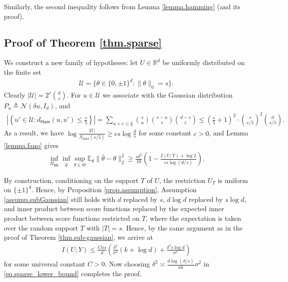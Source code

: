 \documentclass[final,12pt]{colt2018} %
\def \bE {\mathbb{E}}
\def \bR {\mathbb{R}}
\newcommand{\calN}{{\mathcal{N}}}
\newcommand{\calU}{{\mathcal{U}}}
\begin{document}
Similarly, the second inequality follows from Lemma \ref{lemma.hamming} (and its proof). 

\subsection{Proof of Theorem \ref{thm.sparse}}
We construct a new family of hypotheses: let $U\in\bR^d$ be uniformly distributed on the finite set
\begin{align*}
\calU = \{\theta\in \{0,\pm 1\}^d : \|\theta\|_0=s\}.
\end{align*}
Clearly $|\calU|=2^s\binom{d}{s}$. For $u\in\calU$ we associate with the Gaussian distribution $P_u \triangleq \calN(\delta u,I_d)$, and
\begin{align*}
\left|\left\{u'\in\calU: d_{\mathsf{Ham}}(u,u')\le \frac{s}{5}\right\}\right| = \sum_{u+v\le \frac{s}{5}} \binom{s}{u}\binom{s-u}{v}\binom{d-s}{v} \le \left(\frac{s}{5}+1\right)^2\cdot \binom{s}{s/5}^2\binom{d}{s/5}.
\end{align*}
As a result, we have $\log \frac{|\calU|}{N_{\max}(s/5)}\ge cs\log\frac{d}{s}$ for some constant $c>0$, and Lemma \ref{lemma.fano} gives
\begin{align}\label{eq.sparse_lower_bound}
\inf_{\Pi_{\mathsf{BB}}}\inf_{\hat{\theta}}\sup_{\theta\in\Theta} \bE_\theta\|\hat{\theta}-\theta\|_2^2 \ge \frac{s\delta^2}{10}\left(1-\frac{I(U;Y)+\log 2}{cs\log(d/s)}\right).
\end{align}

By construction, conditioning on the support $T$ of $U$, the restriction $U_T$ is uniform on $\{\pm 1\}^d$. Hence, by Proposition \ref{prop.assumption}, Assumption \eqref{assump.subGaussian} still holds with $d$ replaced by $s$, $d\log d$ replaced by $s\log d$, and inner product between score functions replaced by the expected inner product between score functions restricted on $T$, where the expectation is taken over the random support $T$ with $|T|=s$. Hence, by the same argument as in the proof of Theorem \ref{thm.sub-gaussian}, we arrive at
\begin{align*}
I(U;Y) \le \frac{Cns}{d}\left(\frac{\delta^2}{\sigma^2}\left(k+ \log d\right) + \frac{\delta^4 s\log d}{\sigma^4}\right)
\end{align*}
for some universal constant $C>0$. Now choosing $\delta^2\asymp \frac{d\log(d/s)}{nk}\sigma^2$ in \eqref{eq.sparse_lower_bound} completes the proof. 
\end{document}
